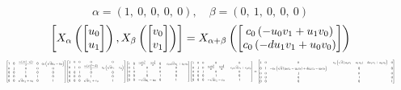 \documentclass[11pt]{article}
\theoremstyle{definition}
\begin{document}
\[
\alpha = \left( 1, \  0, \  0, \  0, \  0\right), \quad \beta = \left( 0, \  1, \  0, \  0, \  0\right)
\]
\[
\scaletoalign{\textwidth}{\left[ X_{\alpha}\left(\left[\begin{matrix}u_{0}\\u_{1}\end{matrix}\right]\right), X_{\beta}\left(\left[\begin{matrix}v_{0}\\v_{1}\end{matrix}\right]\right) \right] = X_{\alpha + \beta}\left(\left[\begin{matrix}c_{0} \left(- u_{0} v_{1} + u_{1} v_{0}\right)\\c_{0} \left(- d u_{1} v_{1} + u_{0} v_{0}\right)\end{matrix}\right]\right)}
\]
\[
\scaletoalign{\textwidth}{{\left[\begin{matrix}1 & 0 & \frac{c_{0} \left(d u_{1}^{2} - u_{0}^{2}\right)}{2} & 0 & c_{0} \left(\sqrt{d} u_{1} - u_{0}\right)\\0 & 1 & 0 & 0 & 0\\0 & 0 & 1 & 0 & 0\\0 & 0 & 0 & 1 & 0\\0 & 0 & \sqrt{d} u_{1} + u_{0} & 0 & 1\end{matrix}\right]} {\left[\begin{matrix}1 & 0 & 0 & 0 & 0\\0 & 1 & 0 & \frac{c_{0} \left(d v_{1}^{2} - v_{0}^{2}\right)}{2} & c_{0} \left(\sqrt{d} v_{1} - v_{0}\right)\\0 & 0 & 1 & 0 & 0\\0 & 0 & 0 & 1 & 0\\0 & 0 & 0 & \sqrt{d} v_{1} + v_{0} & 1\end{matrix}\right]} {\left[\begin{matrix}1 & 0 & \frac{c_{0} d u_{1}^{2}}{2} - \frac{c_{0} u_{0}^{2}}{2} & 0 & - c_{0} \sqrt{d} u_{1} + c_{0} u_{0}\\0 & 1 & 0 & 0 & 0\\0 & 0 & 1 & 0 & 0\\0 & 0 & 0 & 1 & 0\\0 & 0 & - \sqrt{d} u_{1} - u_{0} & 0 & 1\end{matrix}\right]} {\left[\begin{matrix}1 & 0 & 0 & 0 & 0\\0 & 1 & 0 & \frac{c_{0} d v_{1}^{2}}{2} - \frac{c_{0} v_{0}^{2}}{2} & - c_{0} \sqrt{d} v_{1} + c_{0} v_{0}\\0 & 0 & 1 & 0 & 0\\0 & 0 & 0 & 1 & 0\\0 & 0 & 0 & - \sqrt{d} v_{1} - v_{0} & 1\end{matrix}\right]} = {\left[\begin{matrix}1 & 0 & 0 & - c_{0} \left(\sqrt{d} \left(u_{0} v_{1} - u_{1} v_{0}\right) - d u_{1} v_{1} + u_{0} v_{0}\right) & 0\\0 & 1 & - c_{0} \left(\sqrt{d} \left(u_{0} v_{1} - u_{1} v_{0}\right) + d u_{1} v_{1} - u_{0} v_{0}\right) & 0 & 0\\0 & 0 & 1 & 0 & 0\\0 & 0 & 0 & 1 & 0\\0 & 0 & 0 & 0 & 1\end{matrix}\right]}}
\]
\end{document}
